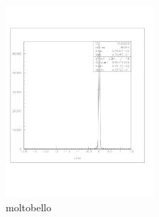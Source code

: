 \documentclass[a4paper]{article}
\begin{document}
\begin{figure}[!htb]
  \includegraphics[width=0.49\textwidth]{ex_images/1_100_140_xs.jpg}
  \caption{moltobello}
  \label{fig:100_xs}
\end{figure}
\end{document}
